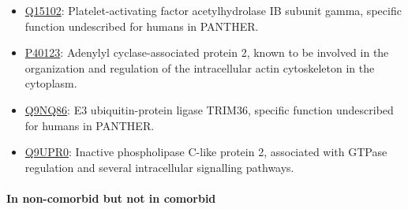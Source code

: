 \begin{itemize}
\item \href{http://www.pantherdb.org/genes/gene.do?acc=HUMAN\%7CHGNC\%3D8576\%7CUniProtKB\%3DQ15102}{Q15102}: Platelet-activating factor acetylhydrolase IB subunit gamma, specific function undescribed for humans in PANTHER.
\item \href{http://www.pantherdb.org/genes/gene.do?acc=HUMAN\%7CHGNC\%3D20039\%7CUniProtKB\%3DP40123}{P40123}: Adenylyl cyclase-associated protein 2, known to be involved in the organization and regulation of the intracellular actin cytoskeleton in the cytoplasm.
\item \href{http://www.pantherdb.org/genes/gene.do?acc=HUMAN\%7CHGNC\%3D16280\%7CUniProtKB\%3DQ9NQ86}{Q9NQ86}: E3 ubiquitin-protein ligase TRIM36, specific function undescribed for humans in PANTHER.
\item \href{http://www.pantherdb.org/genes/gene.do?acc=HUMAN\%7CHGNC\%3D9064\%7CUniProtKB\%3DQ9UPR0}{Q9UPR0}:  Inactive phospholipase C-like protein 2, associated with GTPase regulation and several intracellular signalling pathways.
\end{itemize}

\paragraph{In non-comorbid but not in comorbid}


